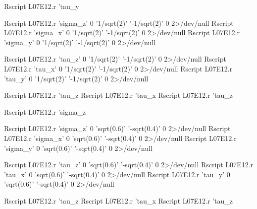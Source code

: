 \documentclass[solutions.tex]{subfiles}
\begin{document}
\bash[stdoutFile=L07E12/tau_y-sigma_y.tex]
Rscript L07E12.r 'tau_y %
\END

\bash[stdoutFile=L07E12/sigma_z-singlet.tex]
Rscript L07E12.r 'sigma_z' 0 '1/sqrt(2)' '-1/sqrt(2)' 0 2>/dev/null
\END
\bash[stdoutFile=L07E12/sigma_x-singlet.tex]
Rscript L07E12.r 'sigma_x' 0 '1/sqrt(2)' '-1/sqrt(2)' 0 2>/dev/null
\END
\bash[stdoutFile=L07E12/sigma_y-singlet.tex]
Rscript L07E12.r 'sigma_y' 0 '1/sqrt(2)' '-1/sqrt(2)' 0 2>/dev/null
\END

\bash[stdoutFile=L07E12/tau_z-singlet.tex]
Rscript L07E12.r 'tau_z' 0 '1/sqrt(2)' '-1/sqrt(2)' 0 2>/dev/null
\END
\bash[stdoutFile=L07E12/tau_x-singlet.tex]
Rscript L07E12.r 'tau_x' 0 '1/sqrt(2)' '-1/sqrt(2)' 0 2>/dev/null
\END
\bash[stdoutFile=L07E12/tau_y-singlet.tex]
Rscript L07E12.r 'tau_y' 0 '1/sqrt(2)' '-1/sqrt(2)' 0 2>/dev/null
\END

\bash[stdoutFile=L07E12/tau_z-sigma_z-singlet.tex]
Rscript L07E12.r 'tau_z %
\END
\bash[stdoutFile=L07E12/tau_x-sigma_x-singlet.tex]
Rscript L07E12.r 'tau_x %
\END
\bash[stdoutFile=L07E12/tau_y-sigma_y-singlet.tex]
Rscript L07E12.r 'tau_z %
\END

\bash[stdoutFile=L07E12/sigma_z-tau_z-singlet.tex]
Rscript L07E12.r 'sigma_z %
\END

\bash[stdoutFile=L07E12/sigma_z-near-singlet.tex]
Rscript L07E12.r 'sigma_z' 0 'sqrt(0.6)' '-sqrt(0.4)' 0 2>/dev/null
\END
\bash[stdoutFile=L07E12/sigma_x-near-singlet.tex]
Rscript L07E12.r 'sigma_x' 0 'sqrt(0.6)' '-sqrt(0.4)' 0 2>/dev/null
\END
\bash[stdoutFile=L07E12/sigma_y-near-singlet.tex]
Rscript L07E12.r 'sigma_y' 0 'sqrt(0.6)' '-sqrt(0.4)' 0 2>/dev/null
\END

\bash[stdoutFile=L07E12/tau_z-near-singlet.tex]
Rscript L07E12.r 'tau_z' 0 'sqrt(0.6)' '-sqrt(0.4)' 0 2>/dev/null
\END
\bash[stdoutFile=L07E12/tau_x-near-singlet.tex]
Rscript L07E12.r 'tau_x' 0 'sqrt(0.6)' '-sqrt(0.4)' 0 2>/dev/null
\END
\bash[stdoutFile=L07E12/tau_y-near-singlet.tex]
Rscript L07E12.r 'tau_y' 0 'sqrt(0.6)' '-sqrt(0.4)' 0 2>/dev/null
\END

\bash[stdoutFile=L07E12/tau_z-sigma_z-near-singlet.tex]
Rscript L07E12.r 'tau_z %
\END
\bash[stdoutFile=L07E12/tau_x-sigma_x-near-singlet.tex]
Rscript L07E12.r 'tau_x %
\END
\bash[stdoutFile=L07E12/tau_y-sigma_y-near-singlet.tex]
Rscript L07E12.r 'tau_z %
\END
\end{document}
